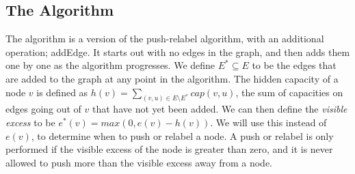\subsection{The Algorithm}
\label{KRAlgorithmSection}


\begin{algorithm}
\caption{\cite{King1992}}\label{King1992Alg}
\end{algorithm}
The algorithm is a version of the push-relabel algorithm, with an additional operation; addEdge. 
It starts out with no edges in the graph, and then adds them one by one as the algorithm progresses.
We define $E^*\subseteq E$ to be the edges that are added to the graph at any point in the algorithm.
The hidden capacity of a node $v$ is defined as $h(v)=\sum\limits_{(v, u)\in E\setminus E^*}{cap(v, u)}$, the sum of capacities on edges going out of $v$ that have not yet been added.
We can then define the \textit{visible excess} to be $e^*(v)=max\left(0, e(v)-h(v)\right)$.
We will use this instead of $e(v)$, to determine when to push or relabel a node.
A push or relabel is only performed if the visible excess of the node is greater than zero, and it is never allowed to push more than the visible excess away from a node.

